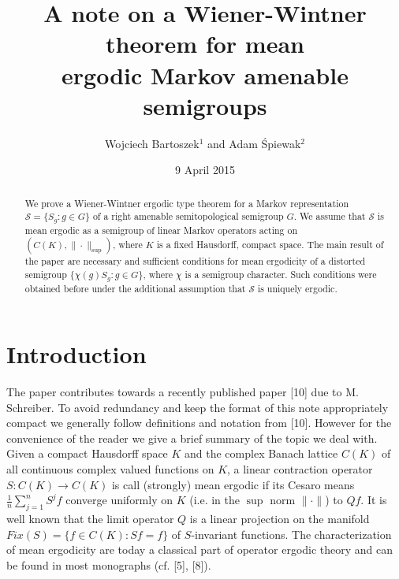 \documentclass{amsart}
\theoremstyle{definition}
\theoremstyle{remark}
\numberwithin{equation}{section}
\begin{document}
\title {A note on a Wiener-Wintner theorem for mean \\ ergodic Markov amenable semigroups }
\author {Wojciech Bartoszek$^1$ and Adam \'Spiewak$^2$ }
\address {Department of Mathematics, Gda\'nsk University of
Technology, \newline
 ul. Narutowicza 11/12, 80 233 Gda\'nsk, Poland}


\date {9 April 2015}
\begin{abstract}
We prove a Wiener-Wintner ergodic type theorem for a Markov representation
$ \mathcal{S} =  \{ S_g : g\in G \}$ of a right amenable
semitopological semigroup $G$. We assume that $\mathcal{S}$ is mean
ergodic as a semigroup of linear Markov operators acting on
$(C(K), \| \cdot \|_{\sup })$, where $K$ is a fixed Hausdorff, compact space.
The main result of the paper are necessary and sufficient conditions for
mean ergodicity of a distorted  semigroup  $\{ \chi(g)S_g : g\in G \}$,
where $\chi $ is a semigroup character. Such conditions were obtained before under the
additional assumption that $\mathcal{S}$ is uniquely ergodic.
\end{abstract}
\maketitle
\pagestyle{myheadings}



\section{Introduction}
The paper contributes towards  a recently published  paper [10]
due to M. Schreiber. To avoid redundancy and keep the format of this note
appropriately compact we generally follow definitions and notation from [10].
However for the convenience of the reader we give a brief summary of
the topic we deal with. Given a compact Hausdorff
space $K$ and the complex Banach lattice $C(K)$ of all continuous complex valued
functions on $K$, a linear contraction operator $S : C(K) \to C(K)$ is call (strongly) mean ergodic if
its Cesaro means $\frac{1}{n}\sum_{j=1}^n S^jf $ converge uniformly  on $K$ (i.e. in the
$\sup $ norm $\| \cdot \|$)  to $Qf$. It is well known that the limit
operator $Q$ is a linear projection on
the manifold $Fix(S) = \{ f\in C(K) : Sf = f \}$ of $S$-invariant functions.
The characterization of  mean ergodicity are today a classical part of
operator ergodic theory and can be found in most monographs (cf. [5], [8]).
\end{document}

